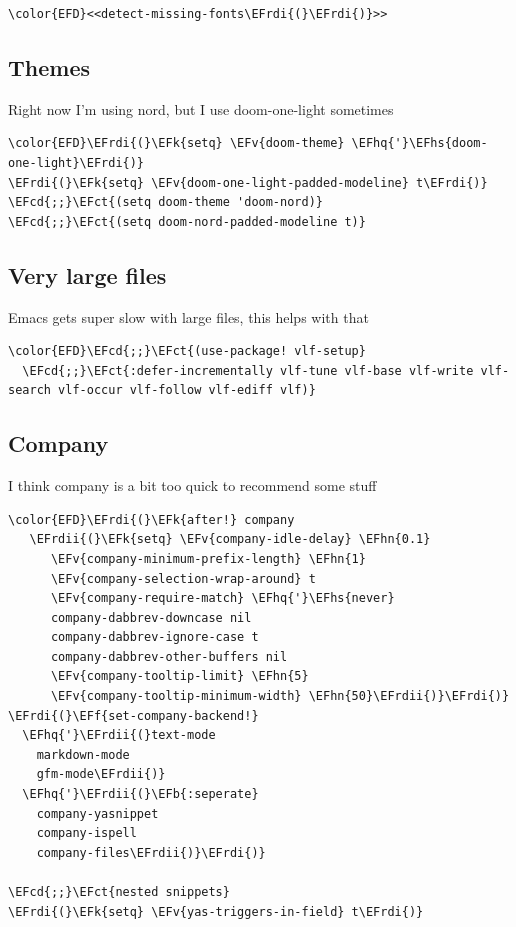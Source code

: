 \documentclass{scrartcl}
\newcommand{\EFk}[1]{\textcolor{EFk}{#1}} %
\newcommand{\EFb}[1]{\textcolor{EFb}{#1}} %
\newcommand{\EFct}[1]{\textcolor{EFct}{#1}} %
\newcommand{\EFv}[1]{\textcolor{EFv}{#1}} %
\newcommand{\EFf}[1]{\textcolor{EFf}{#1}} %
\newcommand{\EFcd}[1]{\textcolor{EFcd}{#1}} %
\newcommand{\EFhn}[1]{\textcolor{EFhn}{\textbf{#1}}} %
\newcommand{\EFhq}[1]{\textcolor{EFhq}{#1}} %
\newcommand{\EFhs}[1]{\textcolor{EFhs}{#1}} %
\newcommand{\EFrdi}[1]{\textcolor{EFrdi}{#1}} %
\newcommand{\EFrdii}[1]{\textcolor{EFrdii}{#1}} %
\begin{document}
\begin{Code}
\begin{Verbatim}[]
\color{EFD}<<detect-missing-fonts\EFrdi{(}\EFrdi{)}>>
\end{Verbatim}
\end{Code}

\subsection{Themes}
\label{sec:orge1bb457}
Right now I'm using nord, but I use doom-one-light sometimes
\begin{Code}
\begin{Verbatim}[]
\color{EFD}\EFrdi{(}\EFk{setq} \EFv{doom-theme} \EFhq{'}\EFhs{doom-one-light}\EFrdi{)}
\EFrdi{(}\EFk{setq} \EFv{doom-one-light-padded-modeline} t\EFrdi{)}
\EFcd{;;}\EFct{(setq doom-theme 'doom-nord)}
\EFcd{;;}\EFct{(setq doom-nord-padded-modeline t)}
\end{Verbatim}
\end{Code}

\subsection{Very large files}
\label{sec:orgc148442}
Emacs gets super slow with large files, this helps with that
\begin{Code}
\begin{Verbatim}[]
\color{EFD}\EFcd{;;}\EFct{(use-package! vlf-setup}
  \EFcd{;;}\EFct{:defer-incrementally vlf-tune vlf-base vlf-write vlf-search vlf-occur vlf-follow vlf-ediff vlf)}
\end{Verbatim}
\end{Code}

\subsection{Company}
\label{sec:org5b6b040}
I think company is a bit too quick to recommend some stuff
\begin{Code}
\begin{Verbatim}[]
\color{EFD}\EFrdi{(}\EFk{after!} company
   \EFrdii{(}\EFk{setq} \EFv{company-idle-delay} \EFhn{0.1}
      \EFv{company-minimum-prefix-length} \EFhn{1}
      \EFv{company-selection-wrap-around} t
      \EFv{company-require-match} \EFhq{'}\EFhs{never}
      company-dabbrev-downcase nil
      company-dabbrev-ignore-case t
      company-dabbrev-other-buffers nil
      \EFv{company-tooltip-limit} \EFhn{5}
      \EFv{company-tooltip-minimum-width} \EFhn{50}\EFrdii{)}\EFrdi{)}
\EFrdi{(}\EFf{set-company-backend!}
  \EFhq{'}\EFrdii{(}text-mode
    markdown-mode
    gfm-mode\EFrdii{)}
  \EFhq{'}\EFrdii{(}\EFb{:seperate}
    company-yasnippet
    company-ispell
    company-files\EFrdii{)}\EFrdi{)}

\EFcd{;;}\EFct{nested snippets}
\EFrdi{(}\EFk{setq} \EFv{yas-triggers-in-field} t\EFrdi{)}
\end{Verbatim}
\end{Code}
\end{document}
